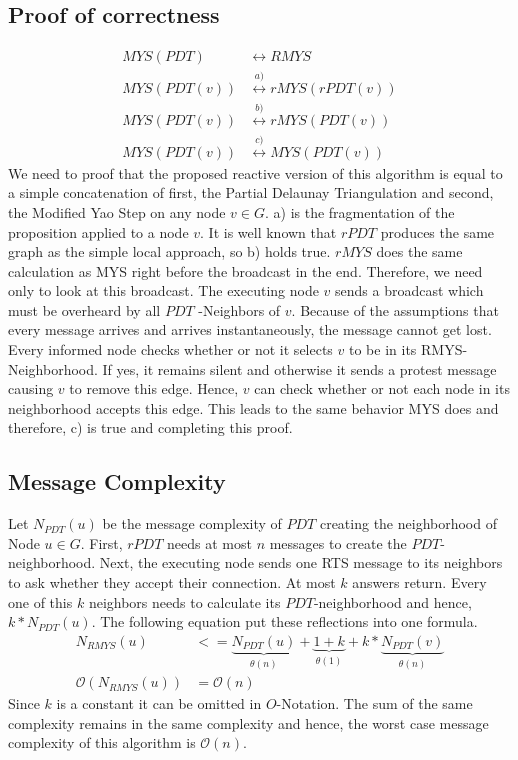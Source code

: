 \subsection{Proof of correctness}
\begin{equation*}
\begin{split}
	MYS(PDT) &\leftrightarrow RMYS\\
	MYS(PDT(v)) &\stackrel{a)}{\leftrightarrow} rMYS(rPDT(v)) \\
    MYS(PDT(v)) &\stackrel{b)}{\leftrightarrow} rMYS(PDT(v))\\
    MYS(PDT(v)) &\stackrel{c)}{\leftrightarrow} MYS(PDT(v)) 
\end{split}
\end{equation*}
We need to proof that the proposed reactive version of this algorithm is equal to a simple concatenation of first, the Partial Delaunay Triangulation and second, the Modified Yao Step on any node $v \in G$.
a) is the fragmentation of the proposition applied to a node $v $.
It is well known that $rPDT $ produces the same graph as the simple local approach, so b) holds true.
$rMYS $ does the same calculation as MYS right before the broadcast in the end.
Therefore, we need only to look at this broadcast.
The executing node $v $ sends a broadcast which must be overheard by all $PDT $ -Neighbors of $v $.
Because of the assumptions that every message arrives and arrives instantaneously, the message cannot get lost.
Every informed node checks whether or not it selects $v $ to be in its RMYS-Neighborhood.
If yes, it remains silent and otherwise it sends a protest message causing $v $ to remove this edge.
Hence, $v $ can check whether or not each node in its neighborhood accepts this edge.
This leads to the same behavior MYS does and therefore, c) is true and completing this proof.


\subsection{Message Complexity}
\label{message_complexity}
Let $N_{PDT}(u) $ be the message complexity of $PDT $ creating the neighborhood of Node $u \in G$.
First, $rPDT $ needs at most $n $ messages to create the $PDT $-neighborhood.
Next, the executing node sends one RTS message to its neighbors to ask whether they accept their connection.
At most $k $ answers return.
Every one of this $k $ neighbors needs to calculate its $PDT $-neighborhood and hence, $k*N_{PDT}(u) $.
The following equation put these reflections into one formula.
\begin{equation*}
\begin{split}
N_{RMYS}(u) &<= \underbrace{N_{PDT}(u)}_{\theta (n)} + \underbrace{1 + k}_{\theta (1)} + k*\underbrace{N_{PDT}(v)}_{\theta (n)} \\
\mathcal{O}(N_{RMYS}(u)) &= \mathcal{O}(n) 
\end{split}
\end{equation*}
Since $k $ is a constant it can be omitted in $O $-Notation.
The sum of the same complexity remains in the same complexity and hence, the worst case message complexity of this algorithm is $\mathcal{O}(n) $.

